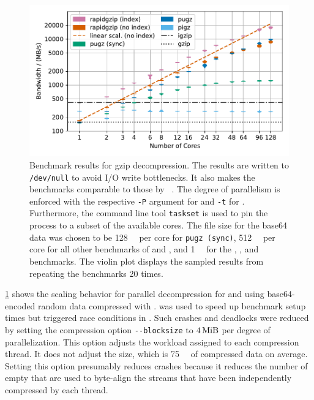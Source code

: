 \begin{figure}
    \centering
    \includegraphics[width=\linewidth]{plots/result-parallel-decompression-base64-dev-null-bandwidths-number-of-threads.pdf}
    \caption{
        Benchmark results for gzip decompression.
        The results are written to \texttt{/dev/null} to avoid I/O write bottlenecks.
        It also makes the benchmarks comparable to those by \citeauthor{pugz}~\cite{pugz}.
        The degree of parallelism is enforced with the respective \texttt{-P} argument for \pragzip and \texttt{-t} for \pugz.
        Furthermore, the command line tool \texttt{taskset} is used to pin the process to a subset of the available cores.
        The file size for the base64 data was chosen to be \SI{128}{\mebi\byte} per core for \texttt{pugz (sync)},
          \SI{512}{\mebi\byte} per core for all other benchmarks of \pragzip and \pugz,
          and \SI{1}{\gibi\byte} for the , , and \pigz benchmarks.
        The violin plot displays the sampled results from repeating the benchmarks 20 times.
    }
    \label{fig:parallel-decompression}
\end{figure}


\cref{fig:parallel-decompression} shows the scaling behavior for parallel decompression for \pugz and \pragzip using base64-encoded random data compressed with \pigz.
\pigz was used to speed up benchmark setup times but triggered race conditions in \pugz.
Such crashes and deadlocks were reduced by setting the \pigz compression option \texttt{-{}-blocksize} to $\SI{4}{\mebi\byte}$ per degree of parallelization.
This option adjusts the workload assigned to each compression thread.
It does not adjust the  size, which is \SI{75}{\kilo\byte} of compressed data on average.
Setting this option presumably reduces crashes because it reduces the number of empty  that are used to byte-align the  streams that have been independently compressed by each thread.

